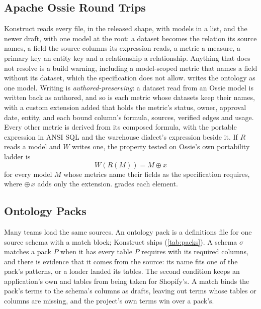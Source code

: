 \subsection{Apache Ossie Round Trips}
\label{sec:ossie}

Konstruct reads every  file, in the released shape, with models in a list, and the newer draft, with one model at the root:
a dataset becomes the relation its source names, a field the source columns its expression reads,
a metric a measure, a primary key an entity key and a relationship a relationship. Anything that
does not resolve is a build warning, including a model-scoped metric that names a field without
its dataset, which the specification does not allow.  writes the
ontology as one model. Writing is \emph{authored-preserving}: a dataset read from an Ossie model is
written back as authored, and so is each metric whose datasets keep their names, with a
 custom extension added that holds the metric's status, owner, approval date,
entity, and each bound column's formula, sources, verified edges and usage. Every other metric is
derived from its composed formula, with the portable expression in ANSI SQL and the warehouse
dialect's expression beside it. If $R$ reads a model and $W$ writes one, the property tested on
Ossie's own portability ladder is
\begin{equation}
  W(R(M)) = M \oplus x
  \label{eq:roundtrip}
\end{equation}
for every model $M$ whose metrics name their fields as the specification requires, where $\oplus\, x$ adds only the
extension.  grades each element.

\subsection{Ontology Packs}
\label{sec:packs}

Many teams load the same sources. An ontology pack is a definitions file for one source schema
with a match block; Konstruct ships \packCount{} (\cref{tab:packs}). A schema $\sigma$ matches a
pack $P$ when it has every table $P$ requires with its required columns, and there is evidence
that it comes from the source: its name fits one of the pack's patterns, or a loader landed its
tables. The second condition keeps an application's own  and  tables
from being taken for Shopify's. A match binds the pack's terms to the schema's columns as drafts,
leaving out terms whose tables or columns are missing, and the project's own terms win over a
pack's.

